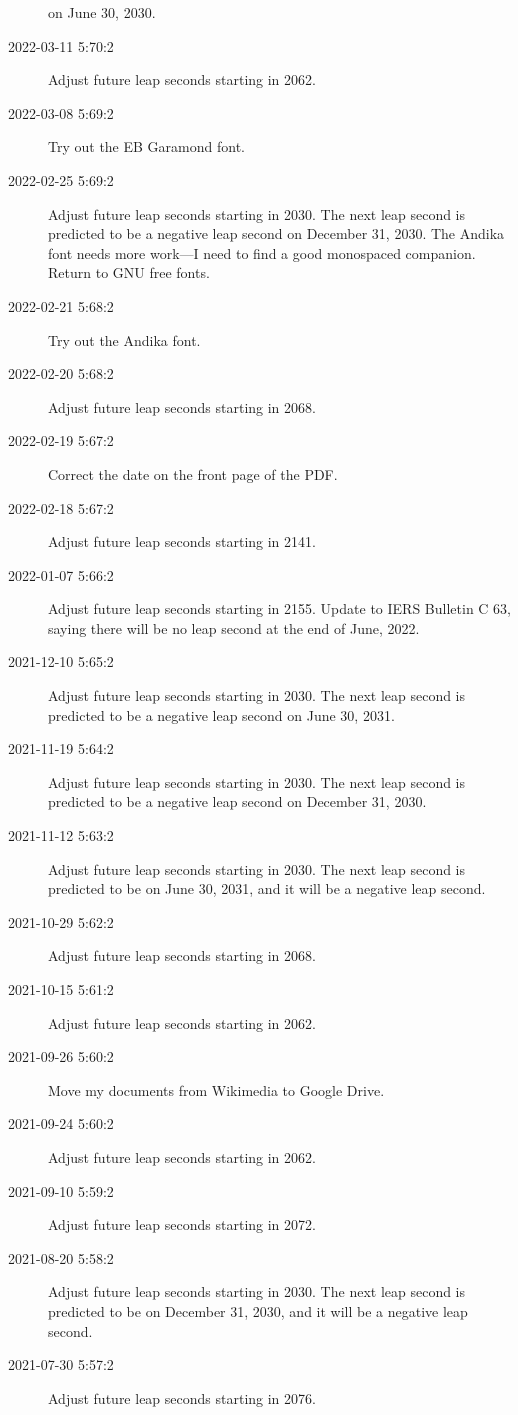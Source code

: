 \documentclass[letterpaper,twoside]{article}
\begin{document}
\begin{description}
  on June 30, 2030.
\item[2022-03-11 5:70:2]Adjust future leap seconds starting in 2062.
\item[2022-03-08 5:69:2]Try out the EB Garamond font.
\item[2022-02-25 5:69:2]Adjust future leap seconds starting in 2030.
  The next leap second is predicted to be a negative leap second
  on December 31, 2030.  The Andika font needs more work---I need to
  find a good monospaced companion.  Return to GNU free fonts.
\item[2022-02-21 5:68:2]Try out the Andika font.
\item[2022-02-20 5:68:2]Adjust future leap seconds starting in 2068.
\item[2022-02-19 5:67:2]Correct the date on the front page of the PDF.
\item[2022-02-18 5:67:2]Adjust future leap seconds starting in 2141.
\item[2022-01-07 5:66:2]Adjust future leap seconds starting in 2155.
  Update to IERS Bulletin C 63, saying there will be no leap second
  at the end of June, 2022.
\item[2021-12-10 5:65:2]Adjust future leap seconds starting in 2030.
  The next leap second is predicted to be a negative leap second
  on June 30, 2031.
\item[2021-11-19 5:64:2]Adjust future leap seconds starting in 2030.
  The next leap second is predicted to be a negative leap second
  on December 31, 2030.
\item[2021-11-12 5:63:2]Adjust future leap seconds starting in 2030.
  The next leap second is predicted to be on June 30, 2031, and it
  will be a negative leap second.
\item[2021-10-29 5:62:2]Adjust future leap seconds starting in 2068.
\item[2021-10-15 5:61:2]Adjust future leap seconds starting in 2062.
\item[2021-09-26 5:60:2]Move my documents from Wikimedia to Google Drive.
\item[2021-09-24 5:60:2]Adjust future leap seconds starting in 2062.
\item[2021-09-10 5:59:2]Adjust future leap seconds starting in 2072.
\item[2021-08-20 5:58:2]Adjust future leap seconds starting in 2030.
  The next leap second is predicted to be on December 31, 2030, and it
  will be a negative leap second.
\item[2021-07-30 5:57:2]Adjust future leap seconds starting in 2076.

\end{description}
\end{document}
